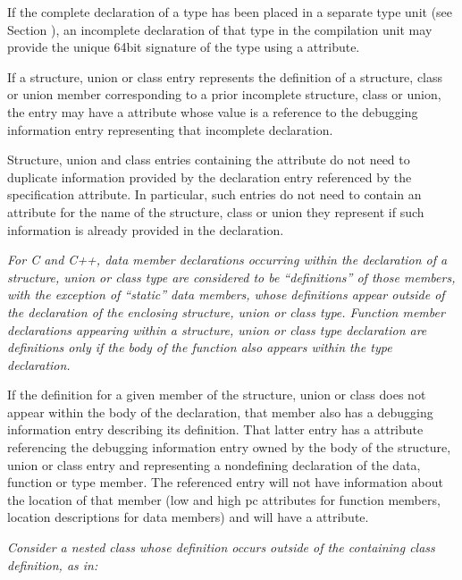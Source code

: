If the complete declaration of a type has been placed in
a separate type unit 
(see Section ), 
an incomplete
declaration of that type in the compilation unit may provide
the unique 64\dash bit signature of the type using a 
attribute.

If a structure, union or class entry represents the definition
of a structure, class or union member corresponding to a prior
incomplete structure, class or union, the entry may have a
 attribute whose value is a reference to
the debugging information entry representing that incomplete
declaration.

Structure, union and class entries containing the
 attribute do not need to duplicate
information provided by the declaration entry referenced by the
specification attribute.  In particular, such entries do not
need to contain an attribute for the name of the structure,
class or union they represent if such information is already
provided in the declaration.

\textit{For C and C++, data member declarations occurring within
the declaration of a structure, union or class type are
considered to be “definitions” of those members, with
the exception of “static” data members, whose definitions
appear outside of the declaration of the enclosing structure,
union or class type. Function member declarations appearing
within a structure, union or class type declaration are
definitions only if the body of the function also appears
within the type declaration.}

If the definition for a given member of the structure, union
or class does not appear within the body of the declaration,
that member also has a debugging information entry describing
its definition. That latter entry has a 
attribute referencing the debugging information entry
owned by the body of the structure, union or class entry and
representing a non\dash defining declaration of the data, function
or type member. The referenced entry will not have information
about the location of that member (low and high pc attributes
for function members, location descriptions for data members)
and will have a  attribute.

\textit{Consider a nested class whose 
definition occurs outside of the containing class definition, as in:}


